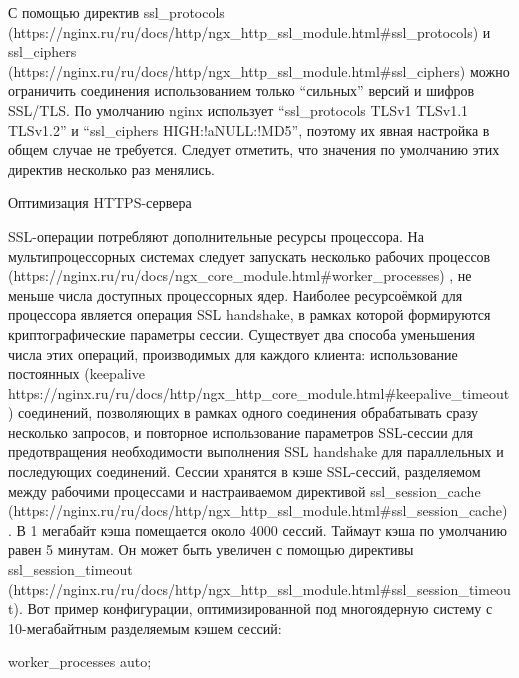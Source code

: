 \documentclass[a4paper,10pt,twoside]{article}
\begin{document}
С помощью директив ssl_protocols (https://nginx.ru/ru/docs/http/ngx_http_ssl_module.html#ssl_protocols) и ssl_ciphers (https://nginx.ru/ru/docs/http/ngx_http_ssl_module.html#ssl_ciphers) можно ограничить соединения использованием только “сильных” версий и шифров SSL/TLS. По умолчанию nginx использует “ssl_protocols TLSv1 TLSv1.1 TLSv1.2” и “ssl_ciphers HIGH:!aNULL:!MD5”, поэтому их явная настройка в общем случае не требуется. Следует отметить, что значения по умолчанию этих директив несколько раз менялись.

Оптимизация HTTPS-сервера

SSL-операции потребляют дополнительные ресурсы процессора. На мультипроцессорных системах следует запускать несколько рабочих процессов  (https://nginx.ru/ru/docs/ngx_core_module.html#worker_processes) , не меньше числа доступных процессорных ядер. Наиболее ресурсоёмкой для процессора является операция SSL handshake, в рамках которой формируются криптографические параметры сессии. Существует два способа уменьшения числа этих операций, производимых для каждого клиента: использование постоянных (keepalive https://nginx.ru/ru/docs/http/ngx_http_core_module.html#keepalive_timeout) соединений, позволяющих в рамках одного соединения обрабатывать сразу несколько запросов, и повторное использование параметров SSL-сессии для предотвращения необходимости выполнения SSL handshake для параллельных и последующих соединений. Сессии хранятся в кэше SSL-сессий, разделяемом между рабочими процессами и настраиваемом директивой ssl_session_cache (https://nginx.ru/ru/docs/http/ngx_http_ssl_module.html#ssl_session_cache) . В 1 мегабайт кэша помещается около 4000 сессий. Таймаут кэша по умолчанию равен 5 минутам. Он может быть увеличен с помощью директивы ssl_session_timeout (https://nginx.ru/ru/docs/http/ngx_http_ssl_module.html#ssl_session_timeout). Вот пример конфигурации, оптимизированной под многоядерную систему с 10-мегабайтным разделяемым кэшем сессий:

worker_processes auto;
\end{document}
